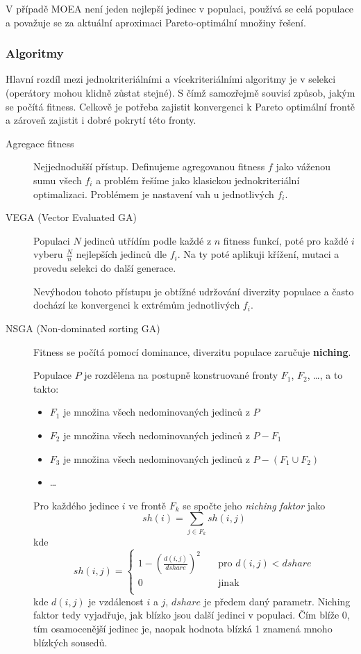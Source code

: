 V případě MOEA není jeden nejlepší jedinec v populaci, používá se celá populace a považuje se za aktuální aproximaci Pareto-optimální množiny řešení. 

\subsubsection{Algoritmy}
Hlavní rozdíl mezi jednokriteriálními a vícekriteriálními algoritmy je v selekci (operátory mohou klidně zůstat stejné). S čímž samozřejmě souvisí způsob, jakým se počítá fitness. Celkově je potřeba zajistit konvergenci k Pareto optimální frontě a zároveň zajistit i dobré pokrytí této fronty.
\begin{description}
	
	
	\item[Agregace fitness] Nejjednodušší přístup. Definujeme agregovanou fitness $f$ jako váženou sumu všech $f_i$ a problém řešíme jako klasickou jednokriteriální optimalizaci. Problémem je nastavení vah u jednotlivých $f_i$.
	\item[VEGA (Vector Evaluated GA)] Populaci $N$ jedinců utřídím podle každé z $n$ fitness funkcí, poté pro každé $i$ vyberu $\frac{N}{n}$ nejlepších jedinců dle $f_i$. Na ty poté aplikuji křížení, mutaci a provedu selekci do další generace. 
	
	Nevýhodou tohoto přístupu je obtížné udržování diverzity populace a často dochází ke konvergenci k extrémům jednotlivých $f_i$.
	\item[NSGA (Non-dominated sorting GA)] Fitness se počítá pomocí dominance, diverzitu populace zaručuje \textbf{niching}.
	
	Populace $P$ je rozdělena na postupně konstruované fronty $F_1$, $F_2$, \dots, a to takto: 
	\begin{itemize}
		
		
		\item $F_1$ je množina všech nedominovaných jedinců z $P$
		\item $F_2$ je množina všech nedominovaných jedinců z $P-F_1$
		\item $F_3$ je množina všech nedominovaných jedinců z $P - (F_1 \cup F_2)$
		\item \dots
	\end{itemize}
	
	Pro každého jedince $i$ ve frontě $F_k$ se spočte jeho \textit{niching faktor} jako
	$$sh(i) = \sum_{j \in F_k} sh(i,j)$$
	kde 
	$$
	sh(i,j) = 
	\begin{cases}
		1 - \left(\frac{d(i,j)}{dshare}\right)^2 	& \quad \text{pro $d(i,j) < dshare$} \\
		0 											& \quad \text{jinak}\\
	\end{cases}
	$$
	kde $d(i,j)$ je vzdálenost $i$ a $j$, $dshare$ je předem daný parametr. Niching faktor tedy vyjadřuje, jak blízko jsou další jedinci v populaci. Čím blíže 0, tím osamocenější jedinec je, naopak hodnota blízká 1 znamená mnoho blízkých sousedů.
	

\end{description}
